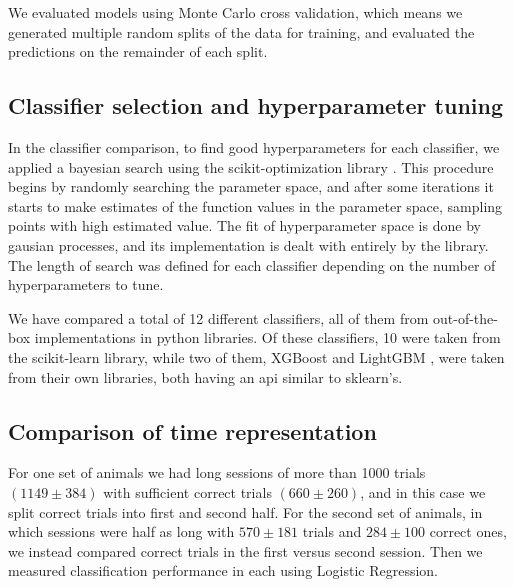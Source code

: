     We evaluated models using Monte Carlo cross validation, which means we generated multiple random splits of the data for training, and evaluated the predictions on the remainder of each split. 

    \subsection{Classifier selection and hyperparameter tuning}
        In the classifier comparison, to find good hyperparameters for each classifier, we applied a bayesian search using the scikit-optimization library \cite{skopt}. This procedure begins by randomly searching the parameter space, and after some iterations it starts to make estimates of the function values in the parameter space, sampling points with high estimated value. The fit of hyperparameter space is done by gausian processes, and its implementation is dealt with entirely by the library. The length of search was defined for each classifier depending on the number of hyperparameters to tune.%
        
        We have compared a total of 12 different classifiers, all of them from out-of-the-box implementations in python libraries. Of these classifiers, 10 were taken from the scikit-learn \cite{scikit-learn} library, while two of them, XGBoost \cite{chen2016xgboost} and LightGBM \cite{ke2017lightgbm}, were taken from their own libraries, both having an api similar to sklearn's.

    \subsection{Comparison of time representation}
        For one set of animals we had long sessions of more than 1000 trials $(1149 \pm 384)$ with sufficient correct trials $(660 \pm 260)$, and in this case we split correct trials into first and second half. For the second set of animals, in which sessions were half as long with $570 \pm 181$ trials and $284\pm 100$ correct ones, we instead compared correct trials in the first versus second session. Then we measured classification performance in each using Logistic Regression. 
        
